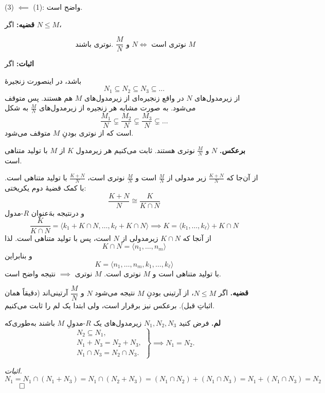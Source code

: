 (3) $\impliedby$ (1):
واضح است.



\hrulefill


\textbf{قضیه:} اگر $N \leqslant M$،

\[
    \text{ نوتری باشند.  } \frac{M}{N} \text{  و } N \iff  \text{ نوترى است  } M
\]



\textbf{اثبات:}
اگر

باشد،‌ در اینصورت زنجیرهٔ
\[
    N_1 \subseteq N_2 \subseteq N_3 \subseteq \dots
\]
از زیرمدول‌های
\(N\)
در واقع زنجیره‌ای از زیرمدول‌های
\(M\)
هم هستند. پس متوقف می‌شود. به صورت مشابه هر زنجیره از زیرمدول‌های
\(\frac{M}{N}\)
به شکل
\[
    \frac{M_1}{N} \subsetneq \frac{M_2}{N} \subsetneq \frac{M_3}{N} \subsetneq \dots
\]
است که از نوتری بودنِ
\(M\)
متوقف می‌شود.

\textbf{برعکس.}
\(N\)
و
\(\frac{M}{N}\)
نوتری هستند. ثابت می‌کنیم هر زیرمدول
\(K\)
از
\(M\)
با تولید متناهی است.
\pagebreak

از آن‌جا که
\(\frac{K+N}{N}\)
زیر مدولی از
\(\frac{M}{N}\)
است و
\(\frac{M}{N}\)
نوتری است،‌
\(\frac{K+N}{N}\)
با تولید متناهی است. با کمک قضیهٔ دوم یکریختی:
\[
    \frac{K+N}{N} \cong \frac{K}{K \cap N}
\]
و درنتیجه به‌َعنوان
\(R\)-مدول
\[
    \frac{K}{K \cap N} = \langle k_1 + K \cap N, \dots, k_\ell + K \cap N \rangle \implies K = \langle k_1, \dots, k_\ell \rangle + K \cap N
\]
از آنجا که
\( K \cap N\)
زیرمدولی از
\(N\)
است،‌ پس با تولید متناهی است. لذا
\[
    K \cap N = \langle n_1, \dots, n_m \rangle
\]
و بنابراین
\[
    K = \langle n_1, \dots, n_m, k_1, \dots, k_\ell \rangle
\]
با تولید متناهی است و
\(M\)
نوتری است.
$M$ نوترى $\implies$ نتیجه واضح است.


\textbf{قضیه.} اگر $N\le M$، از آرتینی بودنِ $M$ نتیجه می‌شود $N$ و $\dfrac{M}{N}$ آرتینی‌اند (دقیقاً همان اثباتِ قبل). برعکس نیز برقرار است، ولی ابتدا یک لم را ثابت می‌کنیم.

\textbf{لم.} فرض کنید $N_1,N_2,N_3$ زیرمدول‌های یک $R$-مدولِ $M$ باشند به‌طوری‌که
\[
    \left.
    \begin{aligned}
        N_2\subseteq N_1, \\
        N_1+N_3=N_2+N_3,  \\
        N_1\cap N_3=N_2\cap N_3.
    \end{aligned}
    \right\}
    \implies
    N_1=N_2.
\]

\textit{اثبات.}
\[
    N_1
    = N_1\cap (N_1+N_3)
    = N_1\cap (N_2+N_3)
    = (N_1\cap N_2)+(N_1\cap N_3)
    = N_1+(N_1\cap N_3)
    = N_2
\]
\(\qed\)

